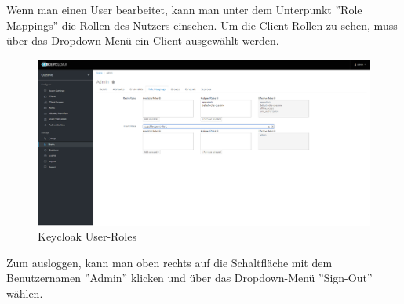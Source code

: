 \noindent Wenn man einen User bearbeitet, kann man unter dem Unterpunkt ''Role Mappings'' die Rollen des Nutzers einsehen. 
Um die Client-Rollen zu sehen, muss über das Dropdown-Menü ein Client ausgewählt werden.

\begin{figure}[H]
    \centering
    \includegraphics[width=1.0\textwidth]{bilder/administrationshandbuch/keycloak_user_roles.png}
    \caption{Keycloak User-Roles}
    \label{fig:Keycloak_User_Roles}
\end{figure}

\noindent Zum ausloggen, kann man oben rechts auf die Schaltfläche mit dem Benutzernamen ''Admin'' klicken 
und über das Dropdown-Menü ''Sign-Out'' wählen.